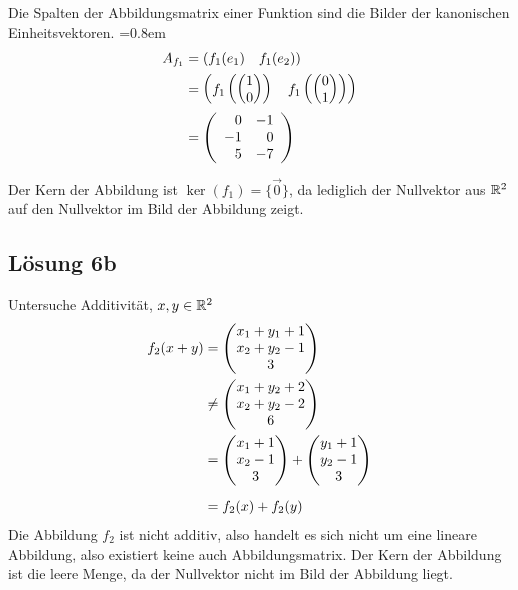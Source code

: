 \documentclass[main.tex]{subfiles}
\begin{document}
Die Spalten der Abbildungsmatrix einer Funktion sind die Bilder der kanonischen Einheitsvektoren.
\arraycolsep=0.8em\def\arraystretch{1}
\begin{align*}
    A_{f_1} &= \left(
        f_1(e_1) \quad f_1(e_2)
    \right) \\
    &= \left(
        f_1\left(\vektor{1 \\ 0}\right) \quad f_1\left(\vektor{0 \\ 1}\right)
    \right) \\
    &= \eqmatrix{rr}{
         0 & -1 \\
        -1 &  0 \\
         5 & -7
    } \\
\end{align*}

Der Kern der Abbildung ist $\ker (f_1) = \{\vec{0}\}$, da lediglich der Nullvektor aus $\mathbb{R}^2$ auf den Nullvektor im Bild der Abbildung zeigt.

\subsection{Lösung 6b}
Untersuche Additivität, $x, y \in \mathbb{R}^2$
\begin{align*}
    f_2(x + y) &= \vektor{ x_1 +y_1 + 1 \\ x_2 + y_2 - 1 \\ 3 } \\
    &\neq \vektor{ x_1 + y_2 + 2 \\ x_2 + y_2 - 2 \\ 6}\\
    &= \vektor{ x_1 + 1 \\ x_2 - 1 \\ 3 } + \vektor{ y_1 + 1 \\ y_2 - 1 \\ 3 }\\[2mm]
    &= f_2(x) + f_2(y)
\end{align*}
Die Abbildung $f_2$ ist nicht additiv, also handelt es sich nicht um eine lineare Abbildung, also existiert keine auch Abbildungsmatrix.
Der Kern der Abbildung ist die leere Menge, da der Nullvektor nicht im Bild der Abbildung liegt. 
\end{document}
